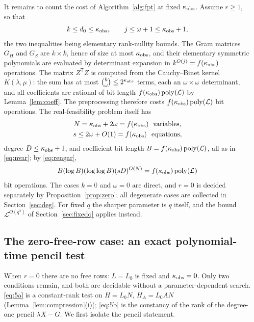 It remains to count the cost of Algorithm~\ref{alg:fpt} at fixed
$\kappa_{\rm obs}$. Assume $r\ge1$, so that
\begin{equation*}
k\le d_0\le\kappa_{\rm obs},\qquad j\le\omega+1\le\kappa_{\rm obs}+1,
\end{equation*}
the two inequalities being elementary rank-nullity bounds. The Gram matrices
$G_H$ and $G_S$ are $k\times k$, hence of size at most
$\kappa_{\rm obs}$, and their elementary symmetric polynomials are evaluated by
determinant expansion in $k^{O(j)}=f(\kappa_{\rm obs})$ operations. The matrix
$Z^{\mathsf T}Z$ is computed from the Cauchy--Binet kernel $K(\lambda,\mu)$: the
sum has at most $\binom{k}{\omega}\le2^{\kappa_{\rm obs}}$ terms, each an
$\omega\times\omega$ determinant, and all coefficients are rational of bit length
$f(\kappa_{\rm obs})\operatorname{poly}(\mathcal L)$ by Lemma~\ref{lem:coeff}.
The preprocessing therefore costs
$f(\kappa_{\rm obs})\operatorname{poly}(\mathcal L)$ bit operations. The
real-feasibility problem itself has
\begin{equation*}
\begin{gathered}
N=\kappa_{\rm obs}+2\omega=f(\kappa_{\rm obs})\ \text{ variables},\\
s\le2\omega+O(1)=f(\kappa_{\rm obs})\ \text{ equations},
\end{gathered}
\end{equation*}
degree $D\le\kappa_{\rm obs}+1$, and coefficient bit length
$B=f(\kappa_{\rm obs})\operatorname{poly}(\mathcal L)$, all as in
\eqref{eq:nvar}; by \eqref{eq:rengar},
\begin{equation*}
B(\log B)(\log\log B)(sD)^{O(N)}
=f(\kappa_{\rm obs})\operatorname{poly}(\mathcal L)
\end{equation*}
bit operations. The cases $k=0$ and $\omega=0$ are direct, and $r=0$ is decided
separately by Proposition~\ref{prop:zero}; all degenerate cases are collected in
Section~\ref{sec:deg}. For fixed $q$ the sharper parameter is $q$ itself, and the
bound $\mathcal L^{O(q^2)}$ of Section~\ref{sec:fixedq} applies instead.

\subsection{The zero-free-row case: an exact polynomial-time pencil test}\label{sec:zero}

When $r=0$ there are no free rows: $L=L_0$ is fixed and $\kappa_{\rm obs}=0$.
Only two conditions remain, and both are decidable without a
parameter-dependent search. \eqref{eq:5a} is a constant-rank test on
$H=L_0N$, $H_A=L_0AN$ (Lemma~\ref{lem:compression}(i)); \eqref{eq:5b} is the
constancy of the rank of the degree-one pencil $\lambda X-G$. We first isolate
the pencil statement.

